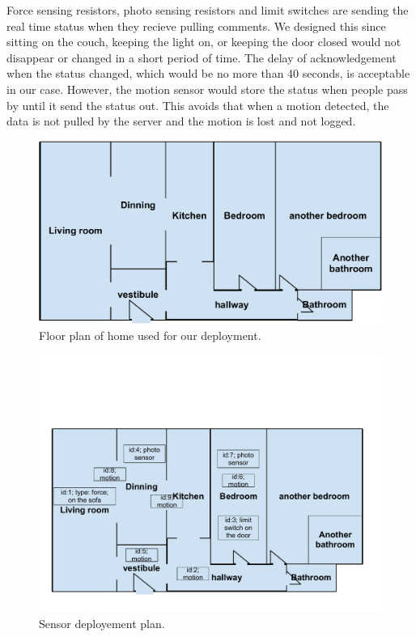 \documentclass[10pt, conference, compsocconf]{IEEEtran}
\begin{document}
Force sensing resistors, photo sensing resistors and limit switches are sending the real time status when they recieve pulling comments. We designed this since sitting on the couch, keeping the light on, or keeping the door closed would not disappear or changed in a short period of time. The delay of acknowledgement when the status changed, which would be no more than 40 seconds, is acceptable in our case. However, the motion sensor would store the status when people pass by until it send the status out. This avoids that when a motion detected, the data is not pulled by the server and the motion is lost and not logged.
\begin{figure}
\begin{center}
\includegraphics[width=0.7\columnwidth]{figs/floor1-crop}
\end{center}
\caption{Floor plan of home used for our deployment.}
\label{fig:floor}
\end{figure}

\begin{figure}
\begin{center}
\includegraphics[width=0.8\columnwidth]{figs/sensor-plan}
\end{center}
\caption{Sensor deployement plan.}
\label{fig:floor}
\end{figure}
\end{document}
